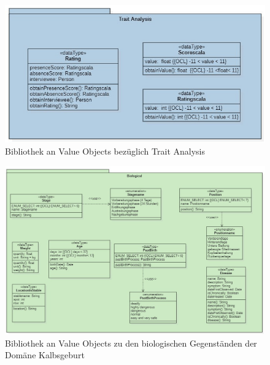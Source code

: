 \begin{landscape}

\begin{figure}[H]
	\center
	\includegraphics[scale=2.75]{Grafiken/modelle/vo-imageanalysis2.jpg}
	\caption{Bibliothek an Value Objects bezüglich \glqq{}Trait Analysis\grqq{}}
	\label{fig: Bibliothek an Value Objects bezüglich Trait Analysis}
\end{figure}

\begin{figure}[H]
	\center
	\includegraphics[scale=2]{Grafiken/modelle/vo-biological.jpg}
	\caption{Bibliothek an Value Objects zu den biologischen Gegenständen der Domäne \glqq{}Kalbsgeburt\grqq{}}
	\label{fig: Bibliothek an Value Objects zu den biologischen Gegenständen der Domäne Kalbsgeburt}
\end{figure}



\end{landscape}
